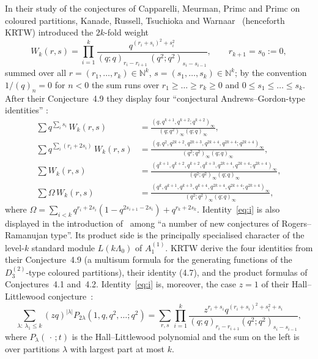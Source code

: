 \documentclass[11pt]{amsart}
\theoremstyle{definition}
\numberwithin{equation}{section}
\newcommand{\N}{\mathbb{N}}
\begin{document}
In their study of the conjectures of Capparelli, Meurman, Primc and Primc on coloured partitions,
Kanade, Russell, Tsuchioka and Warnaar~\cite{KRTW} (henceforth KRTW) introduced the $2k$-fold
weight
\begin{equation}\label{eq:W}
W_k(r,s)=\prod_{i=1}^{k}\frac{q^{(r_i+s_i)^2+s_i^2}}{(q;q)_{r_i-r_{i+1}}\,(q^2;q^2)_{s_i-s_{i-1}}},
\qquad r_{k+1}=s_0:=0,
\end{equation}
summed over all $r=(r_1,\dots,r_k)\in\N^k$, $s=(s_1,\dots,s_k)\in\N^k$; by the convention
$1/(q)_n=0$ for $n<0$ the sum runs over $r_1\ge\dots\ge r_k\ge0$ and $0\le s_1\le\dots\le s_k$. After
their Conjecture~4.9 they display four ``conjectural Andrews--Gordon-type identities''
\cite[§4, display after Conjecture~4.9]{KRTW}:
\begin{align}
\textstyle\sum q^{\sum_i s_i}\,W_k(r,s)&=\frac{(q,q^{k+1},q^{k+2};q^{k+2})_\infty}{(q;q^2)_\infty(q;q)_\infty},
\tag{i}\label{eq:i}\\
\textstyle\sum q^{\sum_i(r_i+2s_i)}\,W_k(r,s)&=\frac{(q,q^2,q^{2k+2},q^{2k+3},q^{2k+4},q^{2k+4};q^{2k+4})_\infty}{(q^2;q^2)_\infty(q;q)_\infty},
\tag{ii}\label{eq:ii}\\
\textstyle\sum W_k(r,s)&=\frac{(q^{k+1},q^{k+2},q^{k+2},q^{k+3},q^{2k+4},q^{2k+4};q^{2k+4})_\infty}{(q^2;q^2)_\infty(q;q)_\infty},
\tag{iii}\label{eq:iii}\\
\textstyle\sum \Omega\,W_k(r,s)&=\frac{(q^{k},q^{k+1},q^{k+3},q^{k+4},q^{2k+4},q^{2k+4};q^{2k+4})_\infty}{(q^2;q^2)_\infty(q;q)_\infty},
\tag{iv}\label{eq:iv}
\end{align}
where $\Omega=\sum_{i<k}q^{r_i+2s_i}(1-q^{2s_{i+1}-2s_i})+q^{r_k+2s_k}$. Identity~\eqref{eq:i} is also
displayed in the introduction of~\cite{KRTW} among ``a number of new conjectures of Rogers--Ramanujan
type''. Its product side is the principally specialised character of the level-$k$ standard module
$L(k\Lambda_0)$ of $A_1^{(1)}$. KRTW derive the four identities from their Conjecture~4.9 (a
multisum formula for the generating functions of the $D_3^{(2)}$-type coloured partitions), their
identity (4.7), and the product formulas of Conjectures~4.1 and~4.2. Identity~\eqref{eq:i} is,
moreover, the case $z=1$ of their Hall--Littlewood conjecture~\cite[Conjecture~2.2]{KRTW}:
\begin{equation}\label{eq:conj22}
\sum_{\lambda:\ \lambda_1\le k}(zq)^{|\lambda|}P_{2\lambda}(1,q,q^2,\dots;q^2)
=\sum_{r,s}\prod_{i=1}^k\frac{z^{r_i+s_i}q^{(r_i+s_i)^2+s_i^2+s_i}}{(q;q)_{r_i-r_{i+1}}(q^2;q^2)_{s_i-s_{i-1}}},
\end{equation}
where $P_\lambda(\,\cdot\,;t)$ is the Hall--Littlewood polynomial and the sum on the left is over
partitions $\lambda$ with largest part at most $k$.
\end{document}
